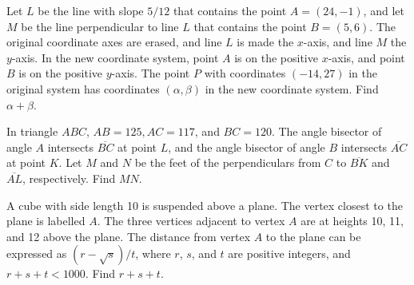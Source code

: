 %	













\begin{question}[name={2011 AIME I, \href{https://artofproblemsolving.com/community/c4p2209666}{Problem 3}}]
	Let $L$ be the line with slope ${5}/{12}$ that contains the point $A=(24,-1)$, and let $M$ be the line perpendicular to line $L$ that contains the point $B=(5,6)$. The original coordinate axes are erased, and line $L$ is made the $x$-axis, and line $M$ the $y$-axis. In the new coordinate system, point $A$ is on the positive $x$-axis, and point $B$ is on the positive $y$-axis. The point $P$ with coordinates $(-14,27)$ in the original system has coordinates $(\alpha,\beta)$ in the new coordinate system. Find $\alpha+\beta$.
\end{question}


%	












\begin{question}[name={2011 AIME I, \href{https://artofproblemsolving.com/community/c4p2209675}{Problem 4}}]
	In triangle $ABC$, $AB=125,AC=117$, and $BC=120$. The angle bisector of angle $A$ intersects $\overline{BC}$ at point $L$, and the angle bisector of angle $B$ intersects $\overline{AC}$ at point $K$. Let $M$ and $N$ be the feet of the perpendiculars from $C$ to $\overline{BK}$ and $\overline{AL}$, respectively. Find $MN$.	
\end{question}


%	











\begin{question}[name={2011 AIME I, \href{https://artofproblemsolving.com/community/c4p2209733}{Problem 13}}]
	A cube with side length 10 is suspended above a plane. The vertex closest to the plane is labelled $A$. The three vertices adjacent to vertex $A$ are at heights 10, 11, and 12 above the plane. The distance from vertex $A$ to the plane can be expressed as $(r-\sqrt{s})/{t}$, where $r$, $s$, and $t$ are positive integers, and $r+s+t<1000$. Find $r+s+t$.
\end{question}


